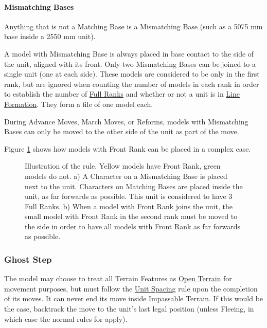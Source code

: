 \paragraph{Mismatching Bases}
\label{mismatching_bases}

Anything that is not a Matching Base is a Mismatching Base (such as a \num{50}\timess{}\num{75} \si{\milli\meter} base inside a \num{25}\timess{}\num{50} \si{\milli\meter} unit).

A model with Mismatching Base is always placed in base contact to the side of the unit, aligned with its front. Only two Mismatching Bases can be joined to a single unit (one at each side). These models are considered to be only in the first rank, but are ignored when counting the number of models in each rank in order to establish the number of \hyperref[full_ranks]{Full Ranks} and whether or not a unit is in \hyperref[line_formation]{Line Formation}. They form a file of one model each.

During Advance Moves, March Moves, or Reforms, models with Mismatching Bases can only be moved to the other side of the unit as part of the move. 

Figure \ref{figure/front_rank} shows how models with Front Rank can be placed in a complex case.

\newcommand{\figFRA}{a)}
\newcommand{\figFRB}{b)}

\begin{figure}[!htbp]
\centering
\def\svgwidth{0.6\textwidth}

\caption{Illustration of the \frontrank{} rule.\captionpar
Yellow models have Front Rank, green models do not.\captionpar
a) A Character on a Mismatching Base is placed next to the unit. Characters on Matching Bases are placed inside the unit, as far forwards as possible. This unit is considered to have 3 Full Ranks.\captionpar
b) When a model with Front Rank joins the unit, the small model with Front Rank in the second rank must be moved to the side in order to have all models with Front Rank as far forwards as possible.
}
\label{figure/front_rank}
\end{figure}

\subsubsection{Ghost Step}
\idx[main=y]{\ghoststep}\label{ghost_step}

The model may choose to treat all Terrain Features as \hyperref[open_terrain]{Open Terrain} for movement purposes, but must follow the \hyperref[unit_spacing]{Unit Spacing} rule upon the completion of its moves. It can never end its move inside Impassable Terrain. If this would be the case, backtrack the move to the unit's last legal position (unless Fleeing, in which case the normal rules for  apply).

